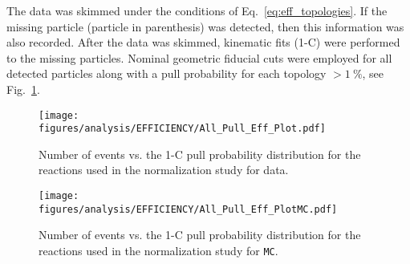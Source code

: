 \documentclass[11pt,a4paper]{article}
\newcommand{\abbr}[1]{\textsc{\texttt{#1}}}
\def\figures{/Users/michaelkunkel/WORK/GIT_HUB/THESIS/figures/print}
\newlength{\figwidth}
\newlength{\hfigheight}
\begin{document}
The data was skimmed under the conditions of Eq.~\ref{eq:eff_topologies}. If the missing particle (particle in parenthesis) was detected, then this information was also recorded. After the data was skimmed, kinematic fits (1-C) were performed to the missing particles. Nominal geometric fiducial cuts were employed for all detected particles along with a pull probability for each topology  $>1~\%$, see Fig.~\ref{fig:eff_pull}.
\begin{figure}[h!]\begin{center}
    \texttt{[image: \\figures/analysis/EFFICIENCY/All\_Pull\_Eff\_Plot.pdf]}
    \caption[Number of events vs. the pull distribution for the reactions used in the normalization study for data]{\label{fig:eff_pull}Number of events vs. the 1-C pull probability distribution for the reactions used in the normalization study for data.}
  \end{center}\end{figure}
\begin{figure}[h!]\begin{center}
    \texttt{[image: \\figures/analysis/EFFICIENCY/All\_Pull\_Eff\_PlotMC.pdf]}
    \caption[Number of events vs. the pull distribution for the reactions used in the normalization study for \abbr{MC}]{\label{fig:eff_pullMC} Number of events vs. the 1-C pull probability distribution for the reactions used in the normalization study for \abbr{MC}.}
  \end{center}\end{figure}
\end{document}
